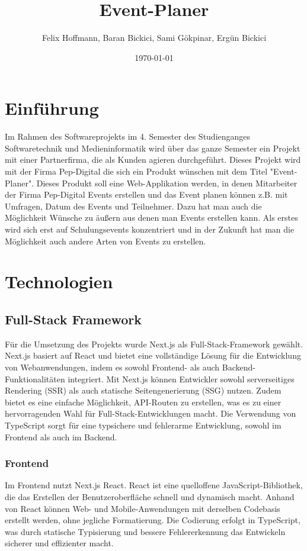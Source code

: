 \documentclass[a4paper,12pt]{article}
\begin{document}
\title{Event-Planer}
\author{Felix Hoffmann, Baran Bickici, Sami Gökpinar, Ergün Bickici}
\date{\today}
\maketitle
\newpage
\tableofcontents
\newpage
\listoffigures
\newpage
\section{Einführung}
Im Rahmen des Softwareprojekts im 4. Semester des Studienganges Softwaretechnik und Medieninformatik wird über das ganze Semester ein Projekt mit einer Partnerfirma, die als Kunden agieren durchgeführt. Dieses Projekt wird mit der Firma Pep-Digital die sich ein Produkt wünschen mit dem Titel "Event-Planer". Dieses Produkt soll eine Web-Applikation werden, in denen Mitarbeiter der Firma Pep-Digital Events erstellen und das Event planen können z.B. mit Umfragen, Datum des Events und Teilnehmer. Dazu hat man auch die Möglichkeit Wünsche zu äußern aus denen man Events erstellen kann. Als erstes wird sich erst auf Schulungsevents konzentriert und in der Zukunft hat man die Möglichkeit auch andere Arten von Events zu erstellen.
\section{Technologien}
\subsection{Full-Stack Framework}
Für die Umsetzung des Projekts wurde Next.js als Full-Stack-Framework gewählt. Next.js basiert auf React und bietet eine vollständige Lösung für die Entwicklung von Webanwendungen, indem es sowohl Frontend- als auch Backend-Funktionalitäten integriert. Mit Next.js können Entwickler sowohl serverseitiges Rendering (SSR) als auch statische Seitengenerierung (SSG) nutzen. Zudem bietet es eine einfache Möglichkeit, API-Routen zu erstellen, was es zu einer hervorragenden Wahl für Full-Stack-Entwicklungen macht. Die Verwendung von TypeScript sorgt für eine typsichere und fehlerarme Entwicklung, sowohl im Frontend als auch im Backend.
\subsubsection{Frontend}
Im Frontend nutzt Next.js React. React ist eine quelloffene JavaScript-Bibliothek, die das Erstellen der Benutzeroberfläche schnell und dynamisch macht. Anhand von React können Web- und Mobile-Anwendungen mit derselben Codebasis erstellt werden, ohne jegliche Formatierung. Die Codierung erfolgt in TypeScript, was durch statische Typisierung und bessere Fehlererkennung das Entwickeln sicherer und effizienter macht.
\end{document}
